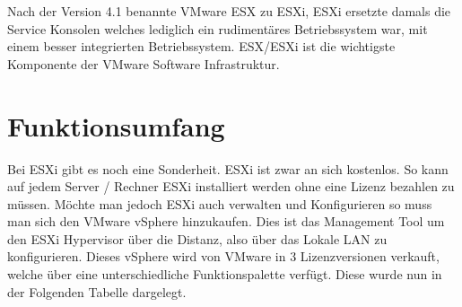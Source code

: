 \documentclass[14pt]{extreport}
\begin{document}
Nach der Version 4.1 benannte VMware ESX zu ESXi, ESXi ersetzte damals die Service Konsolen welches lediglich ein rudimentäres Betriebssystem war, mit einem besser integrierten Betriebssystem. ESX/ESXi ist die wichtigste Komponente der VMware Software Infrastruktur. \\

\section{Funktionsumfang}
Bei ESXi gibt es noch eine Sonderheit. ESXi ist zwar an sich kostenlos. So kann auf jedem Server / Rechner ESXi installiert werden ohne eine Lizenz bezahlen zu müssen. Möchte man jedoch ESXi auch verwalten und Konfigurieren so muss man sich den VMware vSphere hinzukaufen. Dies ist das Management Tool um den ESXi Hypervisor über die Distanz, also über das Lokale LAN zu konfigurieren. Dieses vSphere wird von VMware in 3 Lizenzversionen verkauft, welche über eine unterschiedliche Funktionspalette verfügt. Diese wurde nun in der Folgenden Tabelle dargelegt.
\end{document}
